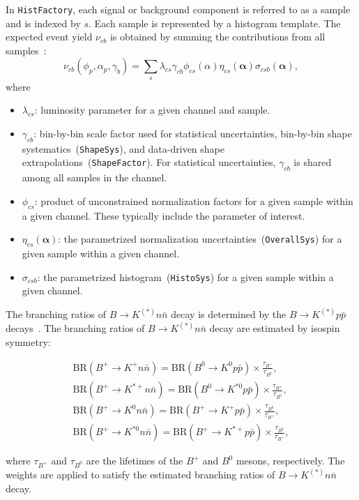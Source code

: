 In \texttt{HistFactory}, each signal or background component is referred to as a sample and is indexed by $s$.
Each sample is represented by a histogram template.
The expected event yield $\nu_{cb}$ is obtained by summing the contributions from all samples~\cite{HistFactory}:
\begin{equation}
    \nu_{cb}(\phi_{p},\alpha_{p},\gamma_{b}) = \sum_{s}
    \lambda_{cs}\gamma_{cb}\phi_{cs}(\alpha)
    \eta_{cs}(\boldsymbol{\alpha})
    \sigma_{csb}(\boldsymbol{\alpha}),
\end{equation}
where
\begin{itemize}
  \item $\lambda_{cs}$: luminosity parameter for a given channel and sample.
  \item $\gamma_{cb}$: bin-by-bin scale factor used for statistical uncertainties, bin-by-bin shape systematics~(\texttt{ShapeSys}), and data-driven shape extrapolations~(\texttt{ShapeFactor}). For statistical uncertainties, $\gamma_{cb}$ is shared among all samples in the channel.
  \item $\phi_{cs}$: product of unconstrained normalization factors for a given sample within a given channel. These typically include the parameter of interest.
  \item $\eta_{cs}(\boldsymbol{\alpha})$: the parametrized normalization uncertainties~(\texttt{OverallSys}) for a given sample within a given channel.
  \item $\sigma_{csb}$: the parametrized histogram~(\texttt{HistoSys}) for a given sample within a given channel.
\end{itemize}

The branching ratios of $B\rightarrow K^{(*)}n\bar{n}$ decay is determined by the $B\rightarrow K^{(*)}p\bar{p}$ decays~\cite{ParticleDataGroup:2024cfk}.
The branching ratios of $B\rightarrow K^{(*)}n\bar{n}$ decay are estimated by isospin symmetry:
\begin{linenomath*}
  \begin{align}
    \textrm{BR}(B^{+} \rightarrow K^{+}n\bar{n}) = \textrm{BR}(B^{0} \rightarrow K^{0}p\bar{p}) \times \frac{\tau_{B^{+}}}{\tau_{B^{0}}},\\
    \textrm{BR}(B^{+} \rightarrow K^{*+}n\bar{n}) = \textrm{BR}(B^{0} \rightarrow K^{*0}p\bar{p}) \times \frac{\tau_{B^{+}}}{\tau_{B^{0}}},\\
    \textrm{BR}(B^{+} \rightarrow K^{0}n\bar{n}) = \textrm{BR}(B^{+} \rightarrow K^{+}p\bar{p}) \times \frac{\tau_{B^{0}}}{\tau_{B^{+}}},\\
    \textrm{BR}(B^{+} \rightarrow K^{*0}n\bar{n}) = \textrm{BR}(B^{+} \rightarrow K^{*+}p\bar{p}) \times \frac{\tau_{B^{0}}}{\tau_{B^{+}}},
\end{align}
\end{linenomath*}
where $\tau_{B^{+}}$ and $\tau_{B^{0}}$ are the lifetimes of the $B^{+}$ and $B^{0}$ mesons, respectively.
The weights are applied to satisfy the estimated branching ratios of $B\rightarrow K^{(*)}n\bar{n}$ decay.

